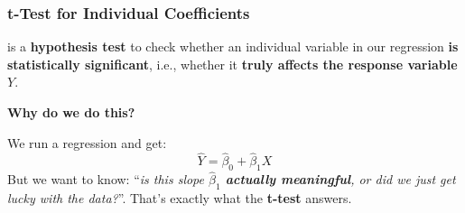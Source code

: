 \subsubsection{t-Test for Individual Coefficients}\label{subsubsection: t-Test for Individual Coefficients}

 is a \textbf{hypothesis test} to check whether an individual variable in our regression \textbf{is statistically significant}, i.e., whether it \textbf{truly affects the response variable} $Y$.

\highspace
\begin{flushleft}
    \textcolor{Green3}{ \textbf{Why do we do this?}}
\end{flushleft}
We run a regression and get:
\begin{equation*}
    \hat{Y} = \hat{\beta}_0 + \hat{\beta}_1 X
\end{equation*}
But we want to know: ``\emph{is this slope $\hat{\beta}_1$ \textbf{actually meaningful}, or did we just get lucky with the data?}''. That's exactly what the \textbf{t-test} answers.

